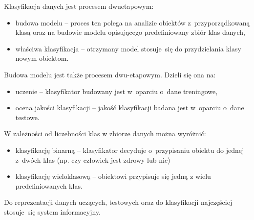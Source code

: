 Klasyfikacja danych jest procesem dwuetapowym:
\begin{itemize}
	\item budowa modelu – proces ten polega na analizie obiektów z przyporządkowaną klasą oraz na budowie modelu opisującego predefiniowany zbiór klas danych,
	\item właściwa klasyfikacja – otrzymany model stosuje się do przydzielania klasy nowym obiektom.
\end{itemize}
Budowa modelu jest także procesem dwu-etapowym. Dzieli się ona na:
\begin{itemize}
	\item uczenie – klasyfikator budowany jest w oparciu o dane treningowe,
	\item ocena jakości klasyfikacji – jakość klasyfikacji badana jest w oparciu o dane testowe.
\end{itemize}
W zależności od liczebności klas w zbiorze danych można wyróżnić:
\begin{itemize}
	\item klasyfikację binarną – klasyfikator decyduje o przypisaniu obiektu do jednej z dwóch klas (np. czy człowiek jest zdrowy lub nie)
	\item klasyfikację wieloklasową – obiektowi przypisuje się jedną z wielu predefiniowanych klas.
\end{itemize}
Do reprezentacji danych uczących, testowych oraz do klasyfikacji najczęściej stosuje się system informacyjny.
\begin{table}[H]
\begin{center}
	\caption{Przykład danych treningowych składających się z 5 atrybutów oraz klasy decyzyjnej. W ostatniej kolumnie znajduje się wynik klasyfikacji. W pięciu przypadkach, klasyfikator poprawnie wskazał klasę.}
	\label{system_informacyjny}
\end{center}
\end{table}

